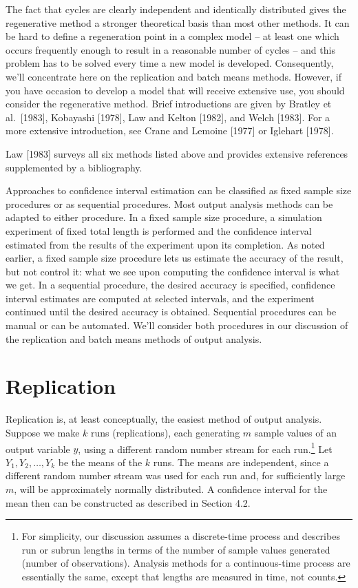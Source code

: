 The fact that cycles are clearly independent and identically distributed
gives the regenerative method a stronger theoretical basis than most other
methods. It can be hard to define a regeneration point in a complex model --
at least one which occurs frequently enough to result in a reasonable number
of cycles -- and this problem has to be solved every time a new model is
developed. Consequently, we'll concentrate here on the replication and batch
means methods. However, if you have occasion to develop a model that will
receive extensive use, you should consider the regenerative method. Brief
introductions are given by Bratley et al.\ [1983], Kobayashi [1978], Law and
Kelton [1982], and Welch [1983]. For a more extensive introduction, see Crane
and Lemoine [1977] or Iglehart [1978].

Law [1983] surveys all six methods listed above and provides extensive
references supplemented by a bibliography.

Approaches to confidence interval estimation can be classified as fixed sample
size procedures or as sequential procedures. Most output analysis methods can
be adapted to either procedure. In a fixed sample size procedure, a simulation
experiment of fixed total length is performed and the confidence interval
estimated from the results of the experiment upon its completion. As noted
earlier, a fixed sample size procedure lets us estimate the accuracy of the
result, but not control it: what we see upon computing the confidence interval
is what we get. In a sequential procedure, the desired accuracy is specified,
confidence interval estimates are computed at selected intervals, and the
experiment continued until the desired accuracy is obtained. Sequential
procedures can be manual or can be automated. We'll consider both procedures
in our discussion of the replication and batch means methods of output
analysis.

\section{Replication}
\label{sec:replication}

Replication is, at least conceptually, the easiest method of output analysis.
Suppose we make $k$ runs (replications), each generating $m$ sample values of
an output variable $y$, using a different random number stream for each
run.\footnote{For simplicity, our discussion assumes a discrete-time process
and describes run or subrun lengths in terms of the number of sample values
generated (number of observations). Analysis methods for a continuous-time
process are essentially the same, except that lengths are measured in time,
not counts.} Let $Y_1, Y_2, \ldots, Y_k$ be the means of the $k$ runs. The means
are independent, since a different random number stream was used for each run
and, for sufficiently large $m$, will be approximately normally distributed. A
\noindent confidence interval for the mean then can be constructed as described in
Section 4.2.

